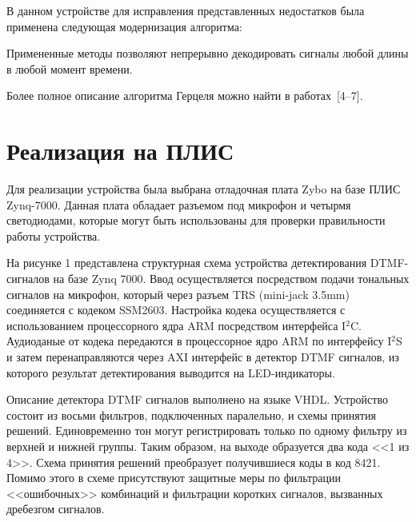\documentclass[a4paper,10pt,twoside]{article}
\begin{document}
\begin{multicols}{2}
В данном устройстве для исправления представленных недостатков была применена следующая модернизация алгоритма:

Примененные методы позволяют непрерывно декодировать сигналы любой длины в любой момент времени.


Более полное описание алгоритма Герцеля можно найти в работах~[4--7].

\section{Реализация на ПЛИС}

Для реализации устройства была выбрана отладочная плата Zybo на базе ПЛИС Zynq-7000. Данная плата обладает разъемом под микрофон и четырмя светодиодами, которые могут быть использованы для проверки правильности работы устройства.

На рисунке 1 представлена структурная схема устройства детектирования DTMF-сигналов на базе Zynq 7000. Ввод осуществляется посредством подачи тональных сигналов на микрофон, который через разъем TRS (mini-jack 3.5mm) соединяется с кодеком SSM2603. Настройка кодека осуществляется с использованием процессорного ядра ARM посредством интерфейса I$^2$C. Аудиоданые от кодека передаются в процессорное ядро ARM по интерфейсу I$^2$S и затем перенаправляются через AXI интерфейс в детектор DTMF сигналов, из которого результат детектирования выводится на LED-индикаторы.

Описание детектора DTMF сигналов выполнено на языке VHDL. Устройство состоит из восьми фильтров, подключенных паралельно, и схемы принятия решений. Единовременно тон могут регистрировать только по одному фильтру из верхней и нижней группы. Таким образом, на выходе образуется два кода <<1 из 4>>. Схема принятия решений преобразует получившиеся коды в код 8421. Помимо этого в схеме присутствуют защитные меры по фильтрации <<ошибочных>> комбинаций и фильтрации коротких сигналов, вызванных дребезгом сигналов.


\end{multicols}
\end{document}
